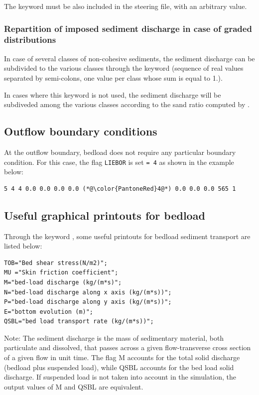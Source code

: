 The keyword  must be also included in the steering file, with an arbitrary value.

\subsubsection{Repartition of imposed sediment discharge in case of graded
distributions}
In case of several classes of non-cohesive sediments, the sediment discharge can
 be subdivided to the various classes through the keyword
 (sequence of real values
separated by
semi-colons, one value per class whose sum is equal to 1.).

In cases where this keyword is not used, the sediment discharge will be
subdiveded among the various classes according to the sand ratio computed
by \gaia.

\subsection{Outflow boundary conditions}
At the outflow boundary, bedload does not require any particular boundary condition.
For this case, the flag \texttt{LIEBOR} is set \texttt{= 4} as shown in the example below:

\begin{lstlisting}[frame=trBL]
5 4 4 0.0 0.0 0.0 0.0 (*@\color{PantoneRed}4@*) 0.0 0.0 0.0 565 1
\end{lstlisting}

\subsection{Useful graphical printouts for bedload}
Through the keyword , some useful printouts for bedload sediment transport are listed below:
\begin{lstlisting}[frame=trBL]
TOB="Bed shear stress(N/m2)";
MU ="Skin friction coefficient";
M="bed-load discharge (kg/(m*s)";
N="bed-load discharge along x axis (kg/(m*s))";
P="bed-load discharge along y axis (kg/(m*s))";
E="bottom evolution (m)";
QSBL="bed load transport rate (kg/(m*s))";
\end{lstlisting}

\begin{WarningBlock}{Note:}
The sediment discharge is the mass of sedimentary material, both particulate and dissolved, that passes across a given flow-transverse cross section of a given flow in unit time. The flag {\ttfamily M} accounts for the total solid discharge (bedload plus suspended load), while {\ttfamily QSBL} accounts for the bed load solid discharge. If suspended load is not taken into account in the simulation, the output values of {\ttfamily M} and {\ttfamily QSBL} are equivalent.
\end{WarningBlock}
